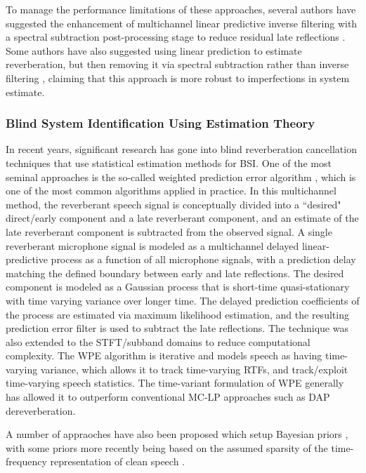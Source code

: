 To manage the performance limitations of these approaches, several authors have suggested the enhancement of multichannel linear predictive inverse filtering with a spectral subtraction post-processing stage to reduce residual late reflections \citep[e.g., ][]{furuya2007robust}. Some authors have also suggested using linear prediction to estimate reverberation, but then removing it via spectral subtraction rather than inverse filtering \citep[e.g., ][]{kinoshita2007multi, nakatani2008blind, nakatani2010speech}, claiming that this approach is more robust to imperfections in system estimate. 


\subsubsection{Blind System Identification Using Estimation Theory} \label{section:bsi_estimation_theory}

In recent years, significant research has gone into blind reverberation cancellation techniques that use statistical estimation methods for BSI. One of the most seminal approaches is the so-called weighted prediction error algorithm \citep[i.e., WPE ][]{nakatani2008blind, nakatani2010speech}, which is one of the most common algorithms applied in practice. In this multichannel method, the reverberant speech signal is conceptually divided into a ``desired" direct/early component and a late reverberant component, and an estimate of the late reverberant component is subtracted from the observed signal. A single reverberant microphone signal is modeled as a multichannel delayed linear-predictive process as a function of all microphone signals, with a prediction delay matching the defined boundary between early and late reflections. The desired component is modeled as a Gaussian process that is short-time quasi-stationary with time varying variance over longer time. The delayed prediction coefficients of the process are estimated via maximum likelihood estimation, and the resulting prediction error filter is used to subtract the late reflections. The technique was also extended to the STFT/subband domains to reduce computational complexity. The WPE algorithm is iterative and models speech as having time-varying variance, which allows it to track time-varying RTFs, and track/exploit time-varying speech statistics. The time-variant formulation of WPE generally has allowed it to outperform conventional MC-LP approaches such as DAP dereverberation.

A number of appraoches have also been proposed which setup Bayesian priors \citep[e.g., ][]{hopgood2005models}, with some priors more recently being based on the assumed sparsity of the time-frequency representation of clean speech \citep{jukic2015multi, jukic2016general}.

